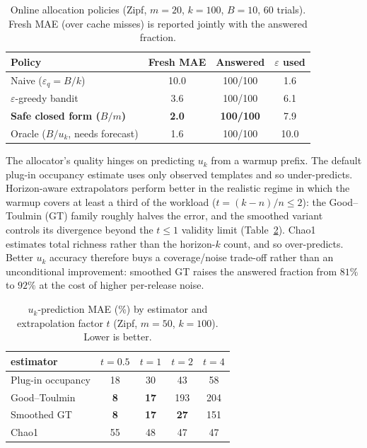 \documentclass[sigconf,nonacm]{acmart}
\newcommand{\eps}{\varepsilon}
\begin{document}
\begin{table}[h]
\footnotesize\centering
\caption{Online allocation policies (Zipf, $m{=}20$, $k{=}100$, $B{=}10$, 60 trials). Fresh MAE (over cache misses) is reported jointly with the answered fraction.}
\label{tab:allocation}
\begin{tabular}{l|ccc}
\toprule
Policy & Fresh MAE & Answered & $\eps$ used \\
\midrule
Naive ($\eps_q{=}B/k$) & 10.0 & 100/100 & 1.6 \\
$\eps$-greedy bandit & 3.6 & 100/100 & 6.1 \\
\textbf{Safe closed form ($B/m$)} & \textbf{2.0} & \textbf{100/100} & 7.9 \\
Oracle ($B/u_k$, needs forecast) & 1.6 & 100/100 & 10.0 \\
\bottomrule
\end{tabular}
\end{table}

\noindent The allocator's quality hinges on predicting $u_k$ from a warmup prefix. The default plug-in occupancy estimate uses only observed templates and so under-predicts. Horizon-aware extrapolators perform better in the realistic regime in which the warmup covers at least a third of the workload ($t=(k{-}n)/n\le2$): the Good--Toulmin (GT) family roughly halves the error, and the smoothed variant~\cite{orlitsky2016unseen} controls its divergence beyond the $t\le1$ validity limit (Table~\ref{tab:predictors}). Chao1~\cite{chao1984} estimates total richness rather than the horizon-$k$ count, and so over-predicts. Better $u_k$ accuracy therefore buys a coverage/noise trade-off rather than an unconditional improvement: smoothed GT raises the answered fraction from $81\%$ to $92\%$ at the cost of higher per-release noise.

\begin{table}[h]
\footnotesize\centering
\caption{$u_k$-prediction MAE (\%) by estimator and extrapolation factor $t$ (Zipf, $m{=}50$, $k{=}100$). Lower is better.}
\label{tab:predictors}
\begin{tabular}{l|cccc}
\toprule
estimator & $t{=}0.5$ & $t{=}1$ & $t{=}2$ & $t{=}4$ \\
\midrule
Plug-in occupancy & 18 & 30 & 43 & 58 \\
Good--Toulmin~\cite{goodtoulmin1956} & \textbf{8} & \textbf{17} & 193 & 204 \\
Smoothed GT~\cite{orlitsky2016unseen} & \textbf{8} & \textbf{17} & \textbf{27} & 151 \\
Chao1~\cite{chao1984} & 55 & 48 & 47 & 47 \\
\bottomrule
\end{tabular}
\end{table}
\end{document}
